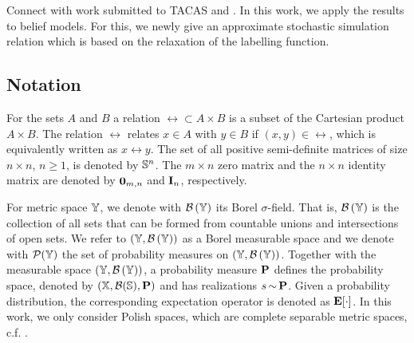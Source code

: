 \documentclass{ifacconf}
\newcommand{\red}[1]{{\color{red} #1}}
\begin{document}
\red{Connect with work submitted to TACAS \citep{tech_report_TACAS} and \citep{haesaert2017verification}.  }
In this work, we apply the results to belief models. For this,  we newly give an approximate stochastic simulation relation which is based on the relaxation of the labelling function.
\subsection{Notation}

For the sets $A$ and $B$ a relation $\rel\subset A\times B$ is a subset of the Cartesian product $A\times B$. The relation $\rel$ relates $x\in A$ with $y\in B$ if $(x,y)\in\rel$, which is equivalently written as $x\rel y$.
%    
%   
%    
%    
    The set of all positive semi-definite matrices of size
    $n \times n$, $n \geq 1$, is denoted by $\S^n$.    The $m \times n$ zero matrix and the $n \times n$ identity matrix are denoted by $\BF{0}_{m, n}$ and $\BF{I}_n$, respectively.
   
For metric space $\Y$, we denote with  $\borel{\Y}$ its Borel $\sigma$-field. That is,  $\borel{\Y}$ is the  
collection of all sets that can be formed from countable unions and intersections of open sets.
We refer to  $(\Y,\borel{\Y})$ as a Borel measurable space and we denote with $\mathcal P(\Y)$ the set of probability measures on $(\Y,\borel{\Y})$.
Together with the measurable space $(\Y,\borel{\Y})$,  a probability measure $\po$ defines the probability space, denoted by $(\X,\mathcal{B}(\mathbb S),\po)$ and has realizations  $s{\,\sim\,}\po$.     Given a probability distribution, the corresponding expectation operator is denoted as  $\Ex[\cdot]$.
In this work,  we only consider Polish spaces, which are complete separable metric spaces, c.f. \cite{bogachev2007measure}. 
\end{document}
